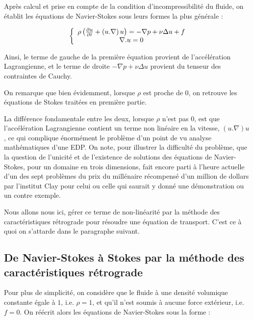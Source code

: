 \documentclass[a4paper,12pt]{article}
\begin{document}
Après calcul et prise en compte de la condition d'incompressibilité du fluide, on établit les équations de Navier-Stokes sous leurs formes la plus générale :

\begin{equation}
\left \{
\begin{array}{c @{} c}
\rho \left( \frac{\partial u}{\partial t}  + \left( u.\nabla \right) u \right) = -\nabla p  + \nu \Delta u  + f \\
\nabla . u  = 0 \\
\end{array}
\right.
\end{equation}

Ainsi, le terme de gauche de la première équation provient de l'accélération Lagrangienne, et le terme de droite $-\nabla p + \nu \Delta u$ provient du tenseur des contraintes de Cauchy.

On remarque que bien évidemment, lorsque $\rho$ est proche de $0$, on retrouve les équations de Stokes traitées en première partie.

La différence fondamentale entre les deux, lorsque $\rho$ n'est pas $0$, est que l'accélération Lagrangienne contient un terme non linéaire en la vitesse, $\left( u.\nabla \right) u$, ce qui complique énormément le problème d'un point de vu analyse mathématiques d'une EDP. On note, pour illustrer la difficulté du problème, que la question de l'unicité et de l'existence de solutions des équations de Navier-Stokes, pour un domaine en trois dimensions, fait encore parti à l'heure actuelle d'un des sept problèmes du prix du millénaire récompensé d'un million de dollars par l’institut Clay pour celui ou celle qui saurait y donné une démonstration ou un contre exemple.

Nous allons nous ici, gérer ce terme de non-linéarité par la méthode des caractéristiques rétrograde pour résoudre une équation de transport. C'est ce à quoi on s'attarde dans le paragraphe suivant.

\subsection{De Navier-Stokes à Stokes par la méthode des caractéristiques rétrograde}

Pour plus de simplicité, on considère que le fluide à une densité volumique constante égale à $1$, i.e. $\rho = 1$, et qu'il n'est soumis à aucune force extérieur, i.e. $f=0$. On réécrit alors les équations de Navier-Stokes sous la forme :
\end{document}
